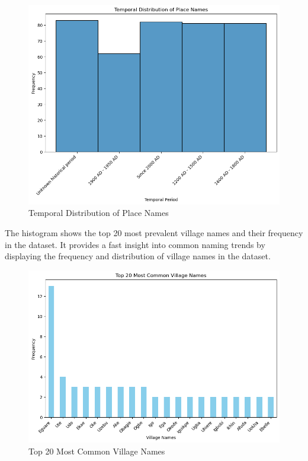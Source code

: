 \begin{figure}
    \centering
    \includegraphics[width=1\linewidth]{histogram1.png}
    \caption{Temporal Distribution of Place Names}
    \label{fig:histgram}
\end{figure}
\newpage

The histogram shows the top 20 most prevalent village names and their frequency in the dataset. It provides a fast insight into common naming trends by displaying the frequency and distribution of village names in the dataset.

\begin{figure}
    \centering
    \includegraphics[width=1\linewidth]{histogram2.png}
    \caption{Top 20 Most Common Village Names}
    \label{fig:histogram2}
\end{figure}
\newpage


